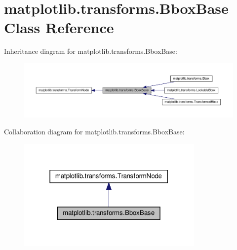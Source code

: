 \hypertarget{classmatplotlib_1_1transforms_1_1BboxBase}{}\section{matplotlib.\+transforms.\+Bbox\+Base Class Reference}
\label{classmatplotlib_1_1transforms_1_1BboxBase}


Inheritance diagram for matplotlib.\+transforms.\+Bbox\+Base\+:
\nopagebreak
\begin{figure}[H]
\begin{center}
\leavevmode
\includegraphics[width=350pt]{classmatplotlib_1_1transforms_1_1BboxBase__inherit__graph}
\end{center}
\end{figure}


Collaboration diagram for matplotlib.\+transforms.\+Bbox\+Base\+:
\nopagebreak
\begin{figure}[H]
\begin{center}
\leavevmode
\includegraphics[width=259pt]{classmatplotlib_1_1transforms_1_1BboxBase__coll__graph}
\end{center}
\end{figure}
